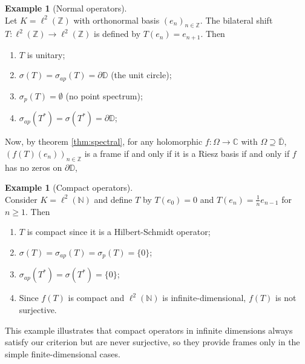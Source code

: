 \documentclass[a4paper,11pt]{article}
\theoremstyle{plain}
\theoremstyle{definition}
\newtheorem{example}[theorem]{Example}
\theoremstyle{remark}
\begin{document}
\begin{example}[Normal operators]
\label{ExBilateralShift}
\mbox{} \\
Let $K = \ell^2(\mathbb{Z})$ with orthonormal basis $(e_n)_{n \in \mathbb{Z}}$. The bilateral shift $T: \ell^2(\mathbb{Z}) \to \ell^2(\mathbb{Z})$ is defined by $T(e_n) = e_{n+1}$. Then 
\begin{enumerate}[label=(\roman*)]
\item $T$ is unitary;
\item $\sigma(T) = \sigma_{ap}(T) =\partial \mathbb{D}$ (the unit circle);
\item $\sigma_p(T) = \emptyset$ (no point spectrum);
\item $\sigma_{ap}(T^*) = \sigma(T^*) = \partial \mathbb{D}$;
\end{enumerate}
Now, by theorem \ref{thm:spectral}, for any holomorphic $f: \Omega \to \mathbb{C}$ with $\Omega \supseteq \overline{\mathbb{D}}$, $(f(T)(e_n))_{n \in \mathbb{Z}}$ is a frame if and only if it is a Riesz basis if and only if $f$ has no zeros on $\partial \mathbb{D}$, 
\end{example}

\begin{example}[Compact operators]
\mbox{} \\
Consider $K = \ell^2(\mathbb{N})$ and define $T$ by $T(e_0) = 0$ and $T(e_n) = \frac{1}{n} e_{n-1}$ for $n \geq 1$. Then
\begin{enumerate}[label=(\roman*)]
\item $T$ is compact since it is a Hilbert-Schmidt operator;
\item $\sigma(T) = \sigma_{ap}(T) = \sigma_p(T) = \{0\}$;
\item $\sigma_{ap}(T^*) = \sigma(T^*) = \{0\}$;
\item Since $f(T)$ is compact and $\ell^2(\mathbb{N})$ is infinite-dimensional, $f(T)$ is not surjective.
\end{enumerate}
This example illustrates that compact operators in infinite dimensions always satisfy our criterion but are never surjective, so they provide frames only in the simple finite-dimensional cases.
\end{example}
\end{document}
